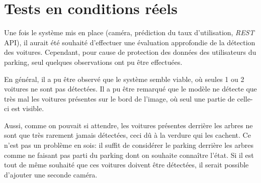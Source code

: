 \section{Tests en conditions réels}
Une fois le système mis en place (caméra, prédiction du taux d'utilisation, \textit{REST} API), il aurait été souhaité d'effectuer une évaluation approfondie de la détection des voitures. Cependant, pour cause de protection des données des utilisateurs du parking, seul quelques observations ont pu être effectuées. 

En général, il a pu être observé que le système semble viable, où seules 1 ou 2 voitures ne sont pas détectées. Il a pu être remarqué que le modèle ne détecte que très mal les voitures présentes sur le bord de l'image, où seul une partie de celle-ci est visible. 

Aussi, comme on pouvait si attendre, les voitures présentes derrière les arbres ne sont que très rarement jamais détectées, ceci dû à la verdure qui les cachent.  Ce n'est pas un problème en sois: il suffit de considérer le parking derrière les arbres comme ne faisant pas parti du parking dont on souhaite connaître l'état. Si il est tout de même souhaité que ces voitures doivent être détectées, il serait possible d'ajouter une seconde caméra.
